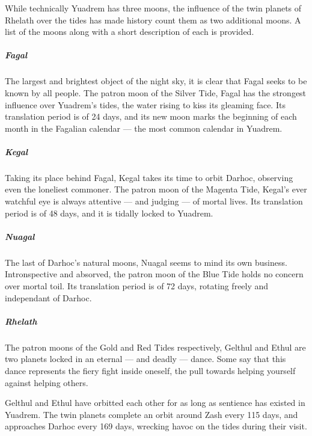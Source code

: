 While technically Yuadrem has three moons, the influence of the twin planets of Rhelath over the tides has made history count them as two additional moons.
A list of the moons along with a short description of each is provided.

\pagebreak

\subparagraph{Fagal} The largest and brightest object of the night sky, it is clear that Fagal seeks to be known by all people.
The patron moon of the Silver Tide, Fagal has the strongest influence over Yuadrem's tides, the water rising to kiss its gleaming face.
Its translation period is of 24 days, and its new moon marks the beginning of each month in the Fagalian calendar --- the most common calendar in Yuadrem.

\subparagraph{Kegal} Taking its place behind Fagal, Kegal takes its time to orbit Darhoc, observing even the loneliest commoner.
The patron moon of the Magenta Tide, Kegal's ever watchful eye is always attentive --- and judging --- of mortal lives.
Its translation period is of 48 days, and it is tidally locked to Yuadrem.

\subparagraph{Nuagal} The last of Darhoc's natural moons, Nuagal seems to mind its own business.
Intronspective and absorved, the patron moon of the Blue Tide holds no concern over mortal toil.
Its translation period is of 72 days, rotating freely and independant of Darhoc.

\subparagraph{Rhelath} The patron moons of the Gold and Red Tides respectively, Gelthul and Ethul are two planets locked in an eternal --- and deadly --- dance.
Some say that this dance represents the fiery fight inside oneself, the pull towards helping yourself against helping others.

Gelthul and Ethul have orbitted each other for as long as sentience has existed in Yuadrem.%
The twin planets complete an orbit around Zash every 115 days, and approaches Darhoc every 169 days, wrecking havoc on the tides during their visit.

\pagebreak
